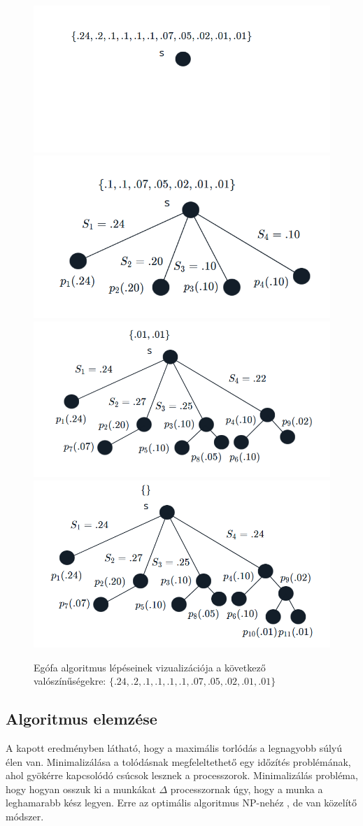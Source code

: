 \documentclass[12pt]{report}
\begin{document}
\begin{figure}[H]
	\begin{center}
		\includegraphics[width=0.49\linewidth]{pictures/egofa1.png}
		\includegraphics[width=0.49\linewidth]{pictures/egofa2.png}
		\includegraphics[width=0.49\linewidth]{pictures/egofa3.png}
		\includegraphics[width=0.49\linewidth]{pictures/egofa4.png}
		\caption{Egófa algoritmus lépéseinek vizualizációja a következő valószínűségekre: 
			\( \{.24, .2, .1, .1, .1, .1, .07, .05, .02, .01, .01\}\)}
		\label{egotree-algorithm}
	\end{center}
\end{figure}


\subsection{Algoritmus elemzése}

A kapott eredményben látható, hogy a maximális torlódás a legnagyobb súlyú élen van.
Minimalizálása a tolódásnak megfeleltethető egy időzítés problémának, ahol gyökérre kapcsolódó csúcsok lesznek a processzorok.
Minimalizálás probléma, hogy hogyan osszuk ki a munkákat \(\Delta\) processzornak úgy, hogy a munka a leghamarabb kész legyen.
Erre az optimális algoritmus NP-nehéz \cite{Schreiber:2018:OMN:3208081.3184400}, de van közelítő módszer.
\end{document}
